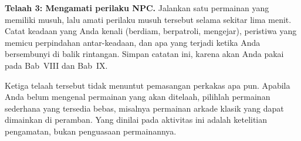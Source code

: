 \begin{aktivitasbox}
\textbf{Telaah 3: Mengamati perilaku NPC.} Jalankan satu permainan yang
memiliki musuh, lalu amati perilaku musuh tersebut selama sekitar lima menit.
Catat keadaan yang Anda kenali (berdiam, berpatroli, mengejar), peristiwa yang
memicu perpindahan antar-keadaan, dan apa yang terjadi ketika Anda bersembunyi
di balik rintangan. Simpan catatan ini, karena akan Anda pakai pada Bab~VIII
dan Bab~IX.
\end{aktivitasbox}

\begin{catatabox}
Ketiga telaah tersebut tidak menuntut pemasangan perkakas apa pun. Apabila
Anda belum mengenal permainan yang akan ditelaah, pilihlah permainan sederhana
yang tersedia bebas, misalnya permainan arkade klasik yang dapat dimainkan di
peramban. Yang dinilai pada aktivitas ini adalah ketelitian pengamatan, bukan
penguasaan permainannya.
\end{catatabox}
